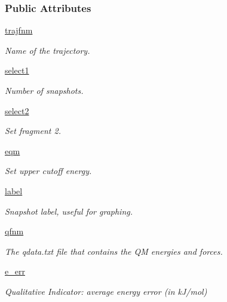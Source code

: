 \subsubsection*{\-Public \-Attributes}
\begin{DoxyCompactItemize}
\item 
\hyperlink{classforcebalance_1_1tinkerio_1_1Interaction__TINKER_a9186a5054ea362c780d68495b08f9234}{trajfnm}
\begin{DoxyCompactList}\small\item\em \-Name of the trajectory. \end{DoxyCompactList}\item 
\hyperlink{classforcebalance_1_1interaction_1_1Interaction_ab39f595a8116711d03992a37776ec7e7}{select1}
\begin{DoxyCompactList}\small\item\em \-Number of snapshots. \end{DoxyCompactList}\item 
\hyperlink{classforcebalance_1_1interaction_1_1Interaction_a98d153938051d0290f3164f28305f160}{select2}
\begin{DoxyCompactList}\small\item\em \-Set fragment 2. \end{DoxyCompactList}\item 
\hyperlink{classforcebalance_1_1interaction_1_1Interaction_a6cac0fab72851f21a91fa5622918efc1}{eqm}
\begin{DoxyCompactList}\small\item\em \-Set upper cutoff energy. \end{DoxyCompactList}\item 
\hyperlink{classforcebalance_1_1interaction_1_1Interaction_ae2e0cc55eb17697784457ec9280c74f0}{label}
\begin{DoxyCompactList}\small\item\em \-Snapshot label, useful for graphing. \end{DoxyCompactList}\item 
\hyperlink{classforcebalance_1_1interaction_1_1Interaction_a713032004b5421d49ca87eadf7e2ad2e}{qfnm}
\begin{DoxyCompactList}\small\item\em \-The qdata.\-txt file that contains the \-Q\-M energies and forces. \end{DoxyCompactList}\item 
\hyperlink{classforcebalance_1_1interaction_1_1Interaction_a761d881eba96250a912eb1a4d18ae511}{e\-\_\-err}
\begin{DoxyCompactList}\small\item\em \-Qualitative \-Indicator\-: average energy error (in k\-J/mol) \end{DoxyCompactList}\item 

\end{DoxyCompactItemize}
